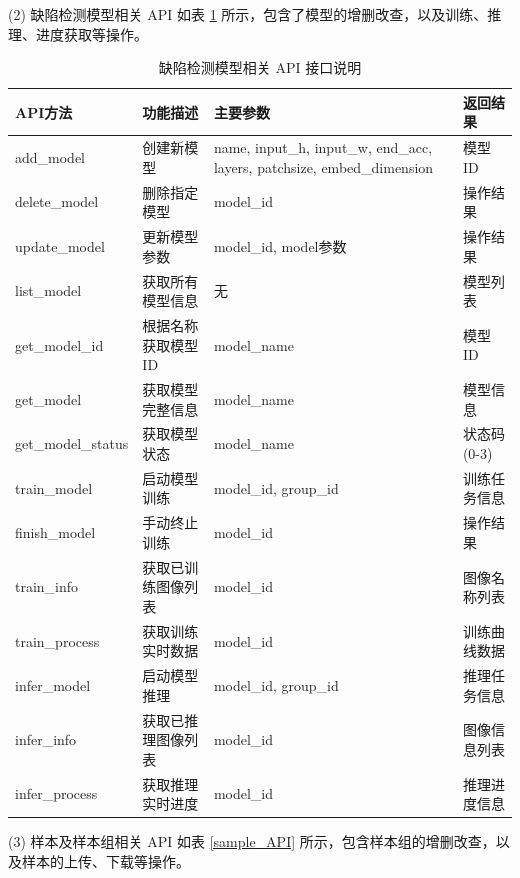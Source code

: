 \documentclass[
  ]{njuthesis}
\begin{document}
(2) 缺陷检测模型相关 API 如表 \ref{model_API} 所示，包含了模型的增删改查，以及训练、推理、进度获取等操作。

\begin{table}[H]
    \centering
    \caption{缺陷检测模型相关 API 接口说明}
    \label{model_API}
    \renewcommand\arraystretch{0.8}
    \begin{tabular}{p{2.5cm}p{3.5cm}p{4cm}p{2.5cm}}
    \toprule
    API方法 & 功能描述 & 主要参数 & 返回结果 \\
    \midrule
    add\_model & 创建新模型 & name, input\_h, input\_w, end\_acc, layers, patchsize, embed\_dimension & 模型ID \\
    delete\_model & 删除指定模型 & model\_id & 操作结果 \\
    update\_model & 更新模型参数 & model\_id, model参数 & 操作结果 \\
    list\_model & 获取所有模型信息 & 无 & 模型列表 \\
    get\_model\_id & 根据名称获取模型ID & model\_name & 模型ID \\
    get\_model & 获取模型完整信息 & model\_name & 模型信息 \\
    get\_model\_status & 获取模型状态 & model\_name & 状态码(0-3) \\
    train\_model & 启动模型训练 & model\_id, group\_id & 训练任务信息 \\
    finish\_model & 手动终止训练 & model\_id & 操作结果 \\
    train\_info & 获取已训练图像列表 & model\_id & 图像名称列表 \\
    train\_process & 获取训练实时数据 & model\_id & 训练曲线数据 \\
    infer\_model & 启动模型推理 & model\_id, group\_id & 推理任务信息 \\
    infer\_info & 获取已推理图像列表 & model\_id & 图像信息列表 \\
    infer\_process & 获取推理实时进度 & model\_id & 推理进度信息 \\
    \bottomrule
    \end{tabular}
\end{table}

(3) 样本及样本组相关 API 如表 \ref{sample_API} 所示，包含样本组的增删改查，以及样本的上传、下载等操作。
\end{document}
